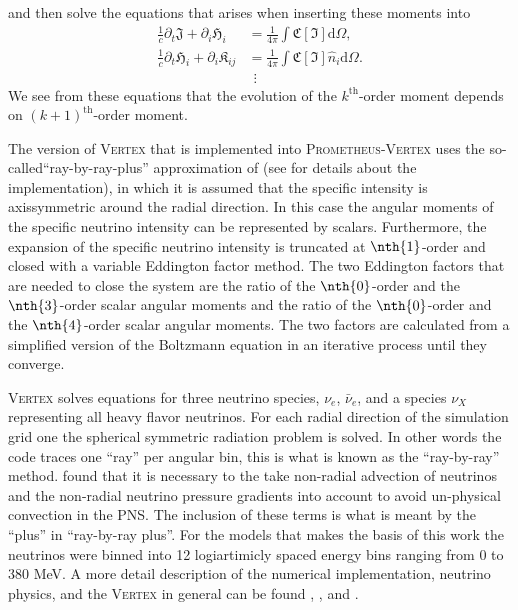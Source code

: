 and then solve the equations that arises when inserting these moments into 
\begin{align}
\frac{1}{c} \partial_t \mathfrak{J} +  \partial_i \mathfrak{H}_i &= \frac{1}{4\pi} \int \mathfrak{C} [\mathfrak{I}] \mathrm{d} \Omega, \\
\frac{1}{c} \partial_t \mathfrak{H}_i + \partial_i \mathfrak{K}_{ij} &= \frac{1}{4\pi} \int \mathfrak{C} [\mathfrak{I}] \hat{n}_i \mathrm{d} \Omega. \\
& \ \ \vdots \nonumber
\end{align}
We see from these equations that the evolution of the $k^{\text{th}}$-order moment depends on $(k+1)^{\text{th}}$-order moment.

The version of \textsc{Vertex} that is implemented into \textsc{Prometheus-Vertex} uses
the so-called``ray-by-ray-plus'' approximation of \cite{buras_06a} (see \cite{hanke_phd} for details about the implementation),
in which it is assumed that the specific intensity is axissymmetric around the radial direction. 
In this case the angular moments of the specific neutrino intensity can be represented by scalars.
Furthermore, the expansion of the specific neutrino intensity is truncated at $\nth{1}$-order and
closed with a variable Eddington factor method. The two Eddington factors that are needed to close the system are the ratio of
the $\nth{0}$-order and the $\nth{3}$-order scalar angular moments and the ratio of the $\nth{0}$-order and the $\nth{4}$-order scalar angular moments.
The two factors are calculated from a simplified version of the Boltzmann equation in an iterative 
process until they converge. 

\textsc{Vertex} solves equations for three neutrino species, $\nu_e$, $\bar{\nu}_e$, and a species $\nu_X$ representing
all heavy flavor neutrinos. For each radial direction of the simulation grid one the spherical symmetric radiation problem is solved.
In other words the code traces one ``ray'' per angular bin, this is what is known as the ``ray-by-ray'' method. \cite{buras_06b} 
found that it is necessary to the take non-radial advection of neutrinos and the non-radial neutrino pressure gradients into account to avoid 
un-physical convection in the PNS. The inclusion of these terms is what is meant by the ``plus'' in ``ray-by-ray plus''.
For the models that makes the basis of this work the neutrinos were binned into 12 logiartimicly spaced energy bins ranging from 0 to 380 MeV.  
A more detail description of the numerical implementation, neutrino physics, and the \textsc{Vertex} in general can
be found \cite{rampp_02}, \cite{hanke_phd}, and \cite{melson_phd}.

